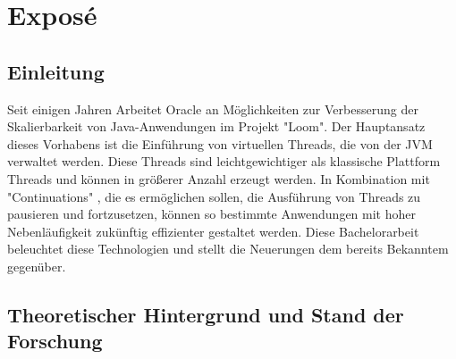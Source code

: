 \chapter{Exposé}

\section{Einleitung}


Seit einigen Jahren Arbeitet Oracle an Möglichkeiten zur Verbesserung der Skalierbarkeit von Java-Anwendungen im Projekt "Loom".
Der Hauptansatz dieses Vorhabens ist die Einführung von virtuellen Threads, die von der JVM verwaltet werden. 
Diese Threads sind leichtgewichtiger als klassische Plattform Threads und können in größerer Anzahl erzeugt werden. 
In Kombination mit "Continuations" \cite{Continuations}, die es ermöglichen sollen, die Ausführung von Threads zu pausieren und fortzusetzen,
können so bestimmte Anwendungen mit hoher Nebenläufigkeit zukünftig effizienter gestaltet werden. Diese Bachelorarbeit 
beleuchtet diese Technologien und stellt die Neuerungen dem bereits Bekanntem gegenüber.





\section{Theoretischer Hintergrund und Stand der Forschung}
\label{sec:hintergrund}

